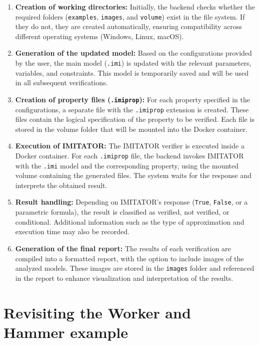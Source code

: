 \begin{enumerate}
    \item \textbf{Creation of working directories:} Initially, the backend checks whether the required folders (\texttt{examples}, \texttt{images}, and \texttt{volume}) exist in the file system. If they do not, they are created automatically, ensuring compatibility across different operating systems (Windows, Linux, macOS).

    \item \textbf{Generation of the updated model:} Based on the configurations provided by the user, the main model (\texttt{.imi}) is updated with the relevant parameters, variables, and constraints. This model is temporarily saved and will be used in all subsequent verifications.

    \item \textbf{Creation of property files (\texttt{.imiprop}):} For each property specified in the configurations, a separate file with the \texttt{.imiprop} extension is created. These files contain the logical specification of the property to be verified. Each file is stored in the volume folder that will be mounted into the Docker container.

    \item \textbf{Execution of IMITATOR:} The IMITATOR verifier is executed inside a Docker container. For each \texttt{.imiprop} file, the backend invokes IMITATOR with the \texttt{.imi} model and the corresponding property, using the mounted volume containing the generated files. The system waits for the response and interprets the obtained result.

    \item \textbf{Result handling:} Depending on IMITATOR’s response (\texttt{True}, \texttt{False}, or a parametric formula), the result is classified as verified, not verified, or conditional. Additional information such as the type of approximation and execution time may also be recorded.

    \item \textbf{Generation of the final report:} The results of each verification are compiled into a formatted report, with the option to include images of the analyzed models. These images are stored in the \texttt{images} folder and referenced in the report to enhance visualization and interpretation of the results.
\end{enumerate}



\section{Revisiting the Worker and Hammer example}

